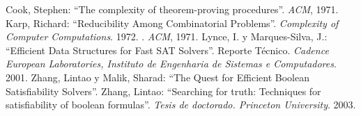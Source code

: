 \documentclass[12pt,lettersize]{article}
\begin{document}
\begin{thebibliography}{99}
Cook, Stephen: ``The complexity of theorem-proving
  procedures''. \emph{ACM}, 1971.
Karp, Richard: ``Reducibility Among Combinatorial
  Problems''. \emph{Complexity of Computer Computations}. 1972.
  . \emph{ACM}, 1971.
Lynce, I. y Marques-Silva, J.: ``Efficient Data Structures for
  Fast SAT Solvers''. Reporte Técnico. \emph{Cadence European Laboratories,
    Instituto de Engenharia de Sistemas e Computadores}. 2001.
Zhang, Lintao y Malik, Sharad: ``The Quest for Efficient Boolean
  Satisfiability Solvers''.
Zhang, Lintao: ``Searching for truth: Techniques for
  satisfiability of boolean formulas''. \emph{Tesis de doctorado. Princeton University}. 2003.
\end{thebibliography}
\end{document}
